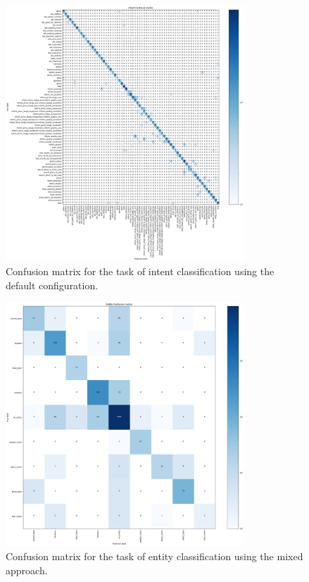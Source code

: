 \documentclass[twocolumn]{article}
\begin{document}
\begin{figure}[H]
    \centering
    \includegraphics[width=0.8\textwidth]{images/intent_default_cf.png}
    \caption{Confusion matrix for the task of intent classification using the default configuration.}
    \label{fig:intent-default-cf}
\end{figure}

\begin{figure}[H]
    \centering
    \includegraphics[width=0.8\textwidth]{images/entity_mixed_cf.png}
    \caption{Confusion matrix for the task of entity classification using the mixed approach.}
    \label{fig:entity-mixed-cf}
\end{figure}
\end{document}
